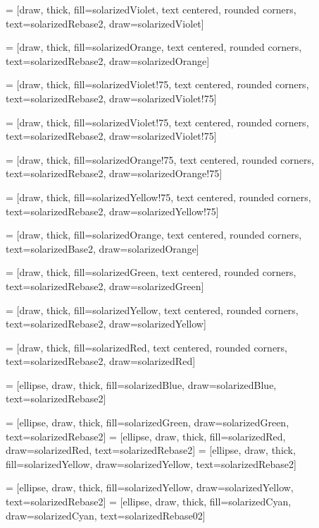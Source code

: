  = [draw, thick, fill=solarizedViolet, text centered, rounded corners,
    text=solarizedRebase2, draw=solarizedViolet]

 = [draw, thick, fill=solarizedOrange, text centered, rounded corners,
    text=solarizedRebase2, draw=solarizedOrange]

 = [draw, thick, fill=solarizedViolet!75, text centered, rounded corners,
    text=solarizedRebase2, draw=solarizedViolet!75]

 = [draw, thick, fill=solarizedViolet!75, text centered, rounded corners,
    text=solarizedRebase2, draw=solarizedViolet!75]

 = [draw, thick, fill=solarizedOrange!75, text centered, rounded corners,
    text=solarizedRebase2, draw=solarizedOrange!75]

 = [draw, thick, fill=solarizedYellow!75, text centered, rounded corners,
    text=solarizedRebase2, draw=solarizedYellow!75]

 = [draw, thick, fill=solarizedOrange, text centered, rounded corners,
text=solarizedBase2, draw=solarizedOrange]

 = [draw, thick, fill=solarizedGreen, text centered, rounded corners,
    text=solarizedRebase2, draw=solarizedGreen]

 = [draw, thick, fill=solarizedYellow, text centered, rounded corners,
    text=solarizedRebase2, draw=solarizedYellow]

 = [draw, thick, fill=solarizedRed, text centered, rounded corners,
    text=solarizedRebase2, draw=solarizedRed]

 = [ellipse, draw, thick, fill=solarizedBlue, draw=solarizedBlue, text=solarizedRebase2]

 = [ellipse, draw, thick, fill=solarizedGreen, draw=solarizedGreen, text=solarizedRebase2]
 = [ellipse, draw, thick, fill=solarizedRed, draw=solarizedRed, text=solarizedRebase2]
 = [ellipse, draw, thick, fill=solarizedYellow, draw=solarizedYellow,
    text=solarizedRebase2]

 = [ellipse, draw, thick, fill=solarizedYellow, draw=solarizedYellow,
    text=solarizedRebase2]
 = [ellipse, draw, thick, fill=solarizedCyan, draw=solarizedCyan, text=solarizedRebase02]

